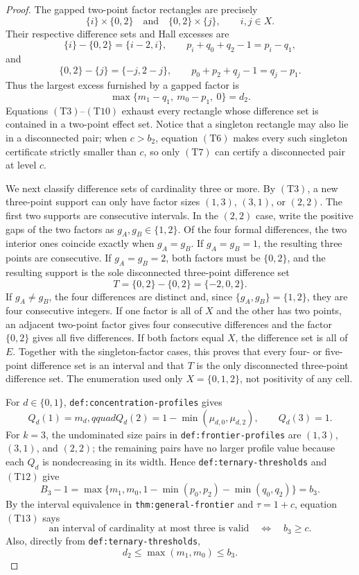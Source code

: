 \documentclass{article}
\begin{document}
\begin{proof}
The gapped two-point factor rectangles are precisely
\[
\{i\}\times\{0,2\}
\quad\text{and}\quad
\{0,2\}\times\{j\},
\qquad i,j\in X.
\tag{T7}
\]
Their respective difference sets and Hall excesses are
\[
\{i\}-\{0,2\}=\{i-2,i\},
\qquad p_i+q_0+q_2-1=p_i-q_1,
\tag{T8}
\]
and
\[
\{0,2\}-\{j\}=\{-j,2-j\},
\qquad p_0+p_2+q_j-1=q_j-p_1.
\tag{T9}
\]
Thus the largest excess furnished by a gapped factor is
\[
\max\{m_1-q_1,\ m_0-p_1,\ 0\}=d_2.
\tag{T10}
\]
Equations \((\mathrm{T3})\)--\((\mathrm{T10})\) exhaust every rectangle whose difference set is contained in a two-point effect set.  Notice that a singleton rectangle may also lie in a disconnected pair; when \(c>b_2\), equation \((\mathrm{T6})\) makes every such singleton certificate strictly smaller than \(c\), so only \((\mathrm{T7})\) can certify a disconnected pair at level \(c\).

We next classify difference sets of cardinality three or more.  By \((\mathrm{T3})\), a new three-point support can only have factor sizes \((1,3)\), \((3,1)\), or \((2,2)\).  The first two supports are consecutive intervals.  In the \((2,2)\) case, write the positive gaps of the two factors as \(g_A,g_B\in\{1,2\}\).  Of the four formal differences, the two interior ones coincide exactly when \(g_A=g_B\).  If \(g_A=g_B=1\), the resulting three points are consecutive.  If \(g_A=g_B=2\), both factors must be \(\{0,2\}\), and the resulting support is the sole disconnected three-point difference set
\[
T=\{0,2\}-\{0,2\}=\{-2,0,2\}.
\tag{T11}
\]
If \(g_A\neq g_B\), the four differences are distinct and, since \(\{g_A,g_B\}=\{1,2\}\), they are four consecutive integers.  If one factor is all of \(X\) and the other has two points, an adjacent two-point factor gives four consecutive differences and the factor \(\{0,2\}\) gives all five differences.  If both factors equal \(X\), the difference set is all of \(E\).  Together with the singleton-factor cases, this proves that every four- or five-point difference set is an interval and that \(T\) is the only disconnected three-point difference set.  The enumeration used only \(X=\{0,1,2\}\), not positivity of any cell.

For \(d\in\{0,1\}\), \texttt{def:concentration-profiles} gives
\[
Q_d(1)=m_d,qquad
Q_d(2)=1-\min(\mu_{d,0},\mu_{d,2}),
\qquad Q_d(3)=1.
\tag{T12}
\]
For \(k=3\), the undominated size pairs in \texttt{def:frontier-profiles} are \((1,3)\), \((3,1)\), and \((2,2)\); the remaining pairs have no larger profile value because each \(Q_d\) is nondecreasing in its width.  Hence \texttt{def:ternary-thresholds} and \((\mathrm{T12})\) give
\[
B_3-1
=\max\{m_1,m_0,1-\min(p_0,p_2)-\min(q_0,q_2)\}
=b_3.
\tag{T13}
\]
By the interval equivalence in \texttt{thm:general-frontier} and \(\tau=1+c\), equation \((\mathrm{T13})\) says
\[
\text{an interval of cardinality at most three is valid}
\quad\Longleftrightarrow\quad b_3\geq c.
\tag{T14}
\]
Also, directly from \texttt{def:ternary-thresholds},
\[
d_2\leq\max(m_1,m_0)\leq b_3.
\tag{T15}
\]


\end{proof}
\end{document}
